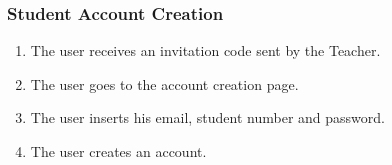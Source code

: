 \subsubsection{Student Account Creation}

\begin{enumerate}
    \item The user receives an invitation code sent by the Teacher.
    \item The user goes to the account creation page.
    \item The user inserts his email, student number and password.
    \item The user creates an account.
\end{enumerate}